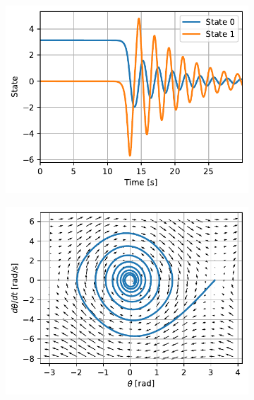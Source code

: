 \documentclass{cmc}
\begin{document}
\begin{figure}[H]
  \centering
  \begin{subfigure}[b]{0.49\textwidth}
    { \centering
      \includegraphics[width=\textwidth]{figures/Unstable_case_state_(x0=[3dot141592653589793,_0dot0])}
      \label{fig:pendulum-unstable-state}
    }
    \caption{}
  \end{subfigure}
  \begin{subfigure}[b]{0.49\textwidth}
    { \centering
      \includegraphics[width=\textwidth]{figures/Unstable_case_phase_(x0=[3dot141592653589793,_0dot0])}
      \label{fig:pendulum-unstable-phase}
    }
    \caption{}
  \end{subfigure}
  \caption{}
  \label{fig:pendulum-unstable}
\end{figure}
\end{document}

